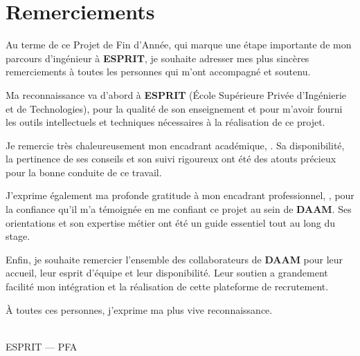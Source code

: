 \chapter*{Remerciements}
\thispagestyle{plain}

\noindent
Au terme de ce Projet de Fin d'Année, qui marque une étape importante de mon parcours
d'ingénieur à \textbf{ESPRIT}, je souhaite adresser mes plus sincères remerciements
à toutes les personnes qui m'ont accompagné et soutenu.

\vspace{0.6em}
\noindent
Ma reconnaissance va d'abord à \textbf{ESPRIT} (École Supérieure Privée d'Ingénierie
et de Technologies), pour la qualité de son enseignement et pour m'avoir fourni
les outils intellectuels et techniques nécessaires à la réalisation de ce projet.

\vspace{0.6em}
\noindent
Je remercie très chaleureusement mon encadrant académique,
\textbf{\EncadrantEsprit}. Sa disponibilité, la pertinence de ses conseils
et son suivi rigoureux ont été des atouts précieux pour la bonne conduite de ce travail.

\vspace{0.6em}
\noindent
J'exprime également ma profonde gratitude à mon encadrant professionnel,
\textbf{\EncadrantEntreprise}, pour la confiance qu'il m'a témoignée en me confiant
ce projet au sein de \textbf{DAAM}. Ses orientations et son expertise métier
ont été un guide essentiel tout au long du stage.

\vspace{0.6em}
\noindent
Enfin, je souhaite remercier l'ensemble des collaborateurs de \textbf{DAAM}
pour leur accueil, leur esprit d'équipe et leur disponibilité. Leur soutien a grandement
facilité mon intégration et la réalisation de cette plateforme de recrutement.

\vspace{1em}
\noindent À toutes ces personnes, j'exprime ma plus vive reconnaissance.

\vspace{2.5cm}
\begin{flushright}
\textbf{\Auteur}\\
ESPRIT --- PFA \Annee
\end{flushright}
\clearpage
